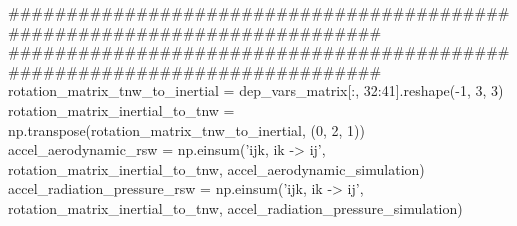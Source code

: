 {}###########################################################################\markdownRendererInterblockSeparator
{}
\markdownRendererSectionEnd \markdownRendererSectionBegin
{}\markdownRendererInterblockSeparator
{}###########################################################################\markdownRendererInterblockSeparator
{}
\markdownRendererSectionEnd \markdownRendererSectionBegin
{}\markdownRendererInterblockSeparator
{}
\markdownRendererSectionEnd \markdownRendererSectionBegin
{}\markdownRendererInterblockSeparator
{}
\markdownRendererSectionEnd \markdownRendererSectionBegin
{}\markdownRendererInterblockSeparator
{}
\markdownRendererSectionEnd \markdownRendererSectionBegin
{}\markdownRendererInterblockSeparator
{}
\markdownRendererSectionEnd \markdownRendererSectionBegin
{}\markdownRendererInterblockSeparator
{}
\markdownRendererSectionEnd \markdownRendererSectionBegin
{}\markdownRendererInterblockSeparator
{}
\markdownRendererSectionEnd \markdownRendererSectionBegin
{}\markdownRendererInterblockSeparator
{}rotation_matrix_tnw_to_inertial = dep_vars_matrix[:, 32:41].reshape(-1, 3, 3) rotation_matrix_inertial_to_tnw = np.transpose(rotation_matrix_tnw_to_inertial, (0, 2, 1))\markdownRendererInterblockSeparator
{}
\markdownRendererSectionEnd \markdownRendererSectionBegin
{}\markdownRendererInterblockSeparator
{}
\markdownRendererSectionEnd \markdownRendererSectionBegin
{}\markdownRendererInterblockSeparator
{}
\markdownRendererSectionEnd \markdownRendererSectionBegin
{}\markdownRendererInterblockSeparator
{}accel_aerodynamic_rsw = np.einsum('ijk, ik -> ij', rotation_matrix_inertial_to_tnw, accel_aerodynamic_simulation) accel_radiation_pressure_rsw = np.einsum('ijk, ik -> ij', rotation_matrix_inertial_to_tnw, accel_radiation_pressure_simulation)\markdownRendererInterblockSeparator
